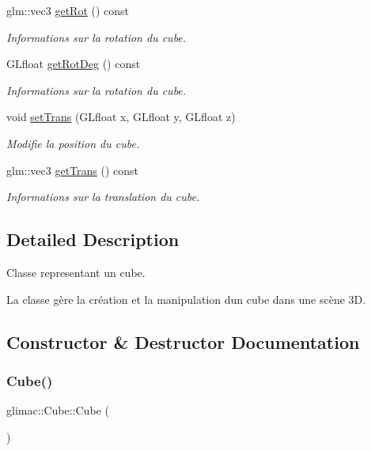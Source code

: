 \begin{DoxyCompactItemize}
glm\+::vec3 \hyperlink{classglimac_1_1Cube_a64f331e9a047ac8f9fe9f20e19a2c8e4}{get\+Rot} () const
\begin{DoxyCompactList}\small\item\em Informations sur la rotation du cube. \end{DoxyCompactList}\item 
G\+Lfloat \hyperlink{classglimac_1_1Cube_a0e97e0f3f757f5320edcc61f7bdbaaa1}{get\+Rot\+Deg} () const
\begin{DoxyCompactList}\small\item\em Informations sur la rotation du cube. \end{DoxyCompactList}\item 
void \hyperlink{classglimac_1_1Cube_a98ab0f3b4ea21152fafe61b11dc09652}{set\+Trans} (G\+Lfloat x, G\+Lfloat y, G\+Lfloat z)
\begin{DoxyCompactList}\small\item\em Modifie la position du cube. \end{DoxyCompactList}\item 
glm\+::vec3 \hyperlink{classglimac_1_1Cube_a3531861251095864b9cc054ed14e81e4}{get\+Trans} () const
\begin{DoxyCompactList}\small\item\em Informations sur la translation du cube. \end{DoxyCompactList}\end{DoxyCompactItemize}


\subsection{Detailed Description}
Classe representant un cube. 

La classe gère la création et la manipulation d\textquotesingle{}un cube dans une scène 3D. 

\subsection{Constructor \& Destructor Documentation}
\mbox{\label{classglimac_1_1Cube_a801f14f22e31defc97297ee0f3409856}} 
\subsubsection{\texorpdfstring{Cube()}{Cube()}}
{\footnotesize\ttfamily glimac\+::\+Cube\+::\+Cube (\begin{DoxyParamCaption}{ }\end{DoxyParamCaption})\hspace{0.3cm}{\ttfamily [inline]}}



